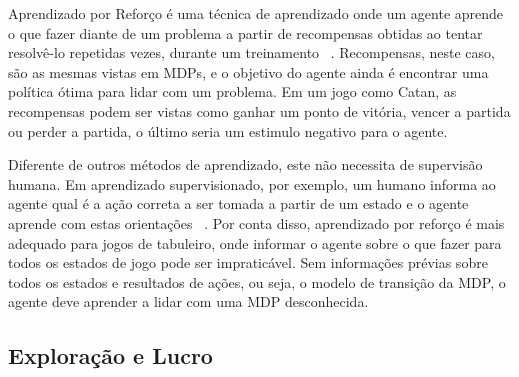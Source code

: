 

Aprendizado por Reforço é uma técnica de aprendizado onde um agente aprende o que fazer diante de um problema a partir de recompensas obtidas ao tentar resolvê-lo repetidas vezes, durante um treinamento ~\cite[Cap 21, pp830-859]{AIMA}. Recompensas, neste caso, são as mesmas vistas em MDPs, e o objetivo do agente ainda é encontrar uma política ótima para lidar com um problema. Em um jogo como Catan, as recompensas podem ser vistas como ganhar um ponto de vitória, vencer a partida ou perder a partida, o último seria um estimulo negativo para o agente.

Diferente de outros métodos de aprendizado, este não necessita de supervisão humana. Em aprendizado supervisionado, por exemplo, um humano informa ao agente qual é a ação correta a ser tomada a partir de um estado e o agente aprende com estas orientações ~\cite[Cap 18, pp695-697]{AIMA}. Por conta disso, aprendizado por reforço é mais adequado para jogos de tabuleiro, onde informar o agente sobre o que fazer para todos os estados de jogo pode ser impraticável. Sem informações prévias sobre todos os estados e resultados de ações, ou seja, o modelo de transição da MDP, o agente deve aprender a lidar com uma MDP desconhecida.

\subsection{\label{sec:secao4.3}Exploração e Lucro}


